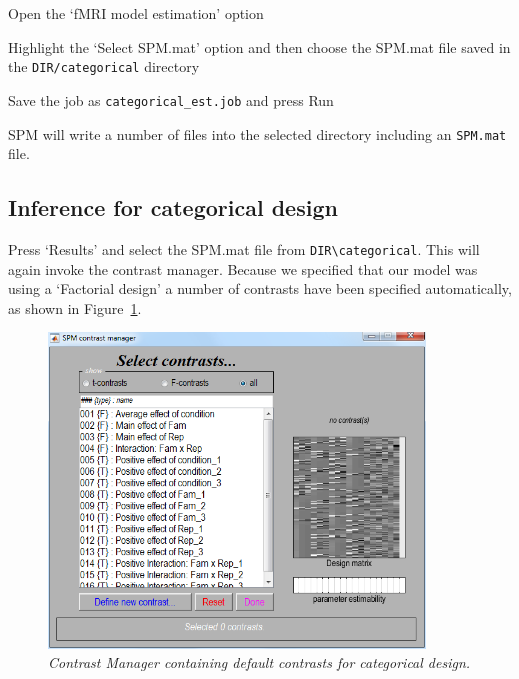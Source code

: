 \bi
\item{Open the `fMRI model estimation' option}
\item{Highlight the `Select SPM.mat' option and then choose the SPM.mat file saved in the \verb!DIR/categorical! directory}
\item{Save the job as \verb!categorical_est.job! and press Run}
\ei

SPM will write a number of files into the selected directory including an \verb!SPM.mat! file.

\subsection{Inference for categorical design}

Press `Results' and select the SPM.mat file from \verb!DIR\categorical!. This will again invoke the contrast manager. Because we specified that our model was using a `Factorial design' a number of contrasts have been specified automatically, as shown in Figure~\ref{cat_contrasts}.

\begin{figure}
\begin{center}
\includegraphics[width=100mm]{faces/cat_contrasts}
\caption{\em Contrast Manager containing default contrasts for categorical design. \label{cat_contrasts}}
\end{center}
\end{figure}

